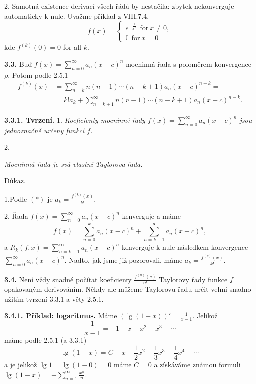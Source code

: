 \documentclass[12pt]{article}
\begin{document}
\smallskip

2. Samotná existence derivací všech řádů by nestačila:  zbytek nekonverguje automaticky k nule. Uvažme příklad z VIII.7.4,
$$
f(x)=\begin{cases} e^{-\frac{1}{x^2}}\ \ \text{for}\ x\neq 0,\\
                       0\ \ \text{for}\ x=0\end{cases}
$$                       
 kde $f^{(k)}(0)=0$ for all $k$.
 
 \bigskip

{\bf 3.3.} Buď $f(x)=\sum_{n=0}^\infty a_n(x-c)^n$ mocninná řada s poloměrem konvergence $\rho$. Potom podle 2.5.1
\begin{equation}
\begin{aligned}
f^{(k)}(x)&=\sum_{n=k}^\infty n(n-1)\cdots(n-k+1)a_n(x-c)^{n-k}=\\
&=k!a_k+\sum_{n=k+1}^\infty n(n-1)\cdots(n-k+1)a_n(x-c)^{n-k}.
\end{aligned} \tag{$*$}
\end{equation}
 

\medskip

{\bf 3.3.1. Tvrzení.} 1. {\em Koeficienty mocninné řady
$f(x)=\sum_{n=0}^\infty a_n(x-c)^n$ jsou jednoznačně určeny funkcí
$f$.}

2. {\em Mocninná řada je svá vlastní Taylorova řada.

Důkaz.} 1.Podle $(*)$ je $a_k=\frac{f^{(k)}(x)}{k!}$.

2. Řada $f(x)=\sum_{n=0}^\infty a_n(x-c)^n$ konverguje a máme
$$
f(x)=\sum_{n=0}^k a_n(x-c)^n+\sum_{n=k+1}^\infty a_n(x-c)^n,
$$
a $R_k(f,x)=\sum_{n=k+1}^\infty a_n(x-c)^n$ konverguje k nule následkem konvergence $\sum_{n=0}^\infty a_n(x-c)^n$. Nadto, jak jsme již pozorovali, máme $a_k=\frac{f^{(k)}(x)}{k!}$.\sq

\bigskip

{\bf 3.4.} Není vždy snadné počítat koeficienty
$\frac{f^{(n)}(c)}{n!}$ Taylorovy řady funkce $f$ opakovaným derivováním. Někdy ale můžeme Taylorovu řadu určit velmi snadno užitím
tvrzení 3.3.1 a věty 2.5.1.

\medskip

{\bf 3.4.1. Příklad: logaritmus.} Máme $(\lg(1-x))'=\frac{1}{x-1}$. Jelikož
$$
\frac{1}{x-1}=-1-x-x^2-x^3-\cdots
$$
máme podle 2.5.1 (a 3.3.1)
$$
\lg(1-x)= C-x-\frac12 x^2-\frac13 x^3-\frac14 x^4 -\cdots
$$
a je jelikož $\lg 1=\lg(1-0)=0$ máme $C=0$ a získáváme známou formuli $\lg(1-x)=-\sum_{n=1}^\infty\frac{x^n}{n}$.
\end{document}
